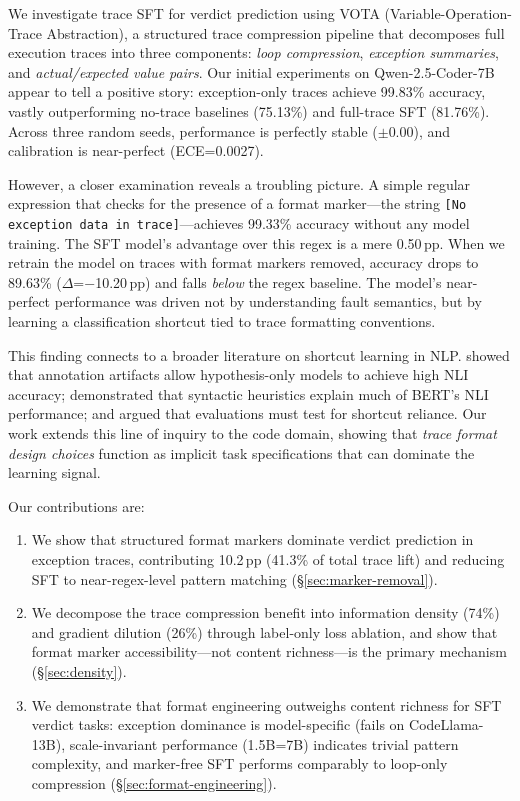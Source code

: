 \documentclass[11pt,a4paper]{article}
\newcommand{\pp}{\,\text{pp}}
\begin{document}
We investigate trace SFT for verdict prediction using VOTA (Variable-Operation-Trace Abstraction), a structured trace compression pipeline that decomposes full execution traces into three components: \emph{loop compression}, \emph{exception summaries}, and \emph{actual/expected value pairs}.
Our initial experiments on Qwen-2.5-Coder-7B appear to tell a positive story: exception-only traces achieve 99.83\% accuracy, vastly outperforming no-trace baselines (75.13\%) and full-trace SFT (81.76\%).
Across three random seeds, performance is perfectly stable ($\pm$0.00), and calibration is near-perfect (ECE=0.0027).

However, a closer examination reveals a troubling picture.
A simple regular expression that checks for the presence of a format marker---the string \texttt{[No exception data in trace]}---achieves 99.33\% accuracy without any model training.
The SFT model's advantage over this regex is a mere 0.50$\pp$.
When we retrain the model on traces with format markers removed, accuracy drops to 89.63\% ($\Delta$=$-$10.20$\pp$) and falls \emph{below} the regex baseline.
The model's near-perfect performance was driven not by understanding fault semantics, but by learning a classification shortcut tied to trace formatting conventions.

This finding connects to a broader literature on shortcut learning in NLP.
\citet{gururangan2018annotation} showed that annotation artifacts allow hypothesis-only models to achieve high NLI accuracy; \citet{mccoy2019right} demonstrated that syntactic heuristics explain much of BERT's NLI performance; and \citet{gardner2021competency} argued that evaluations must test for shortcut reliance.
Our work extends this line of inquiry to the code domain, showing that \emph{trace format design choices} function as implicit task specifications that can dominate the learning signal.

Our contributions are:
\begin{enumerate}
    \item We show that structured format markers dominate verdict prediction in exception traces, contributing 10.2$\pp$ (41.3\% of total trace lift) and reducing SFT to near-regex-level pattern matching (\S\ref{sec:marker-removal}).
    \item We decompose the trace compression benefit into information density (74\%) and gradient dilution (26\%) through label-only loss ablation, and show that format marker accessibility---not content richness---is the primary mechanism (\S\ref{sec:density}).
    \item We demonstrate that format engineering outweighs content richness for SFT verdict tasks: exception dominance is model-specific (fails on CodeLlama-13B), scale-invariant performance (1.5B=7B) indicates trivial pattern complexity, and marker-free SFT performs comparably to loop-only compression (\S\ref{sec:format-engineering}).
\end{enumerate}
\end{document}
